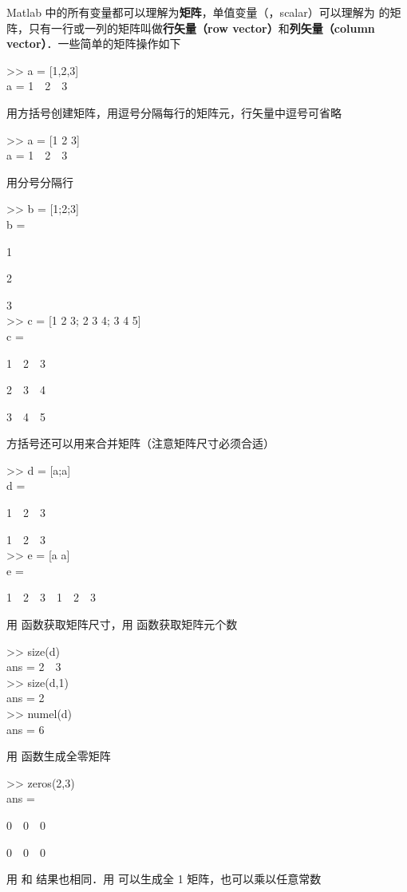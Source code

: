 Matlab 中的所有变量都可以理解为\textbf{矩阵}，单值变量（，scalar）可以理解为  的矩阵，只有一行或一列的矩阵叫做\textbf{行矢量（row vector）}和\textbf{列矢量（column vector）}．一些简单的矩阵操作如下
\begin{Command}
>> a = [1,2,3] \\
a = 1\ \ 2\ \ 3
\end{Command}
用方括号创建矩阵，用逗号分隔每行的矩阵元，行矢量中逗号可省略
\begin{Command}
>> a = [1 2 3] \\
a = 1\ \ 2\ \ 3
\end{Command}
用分号分隔行
\begin{Command}
>> b = [1;2;3] \\
b = \par
1 \par
2 \par
3 \\
>> c = [1 2 3; 2 3 4; 3 4 5]\\
c = \par
1\ \ 2\ \ 3 \par
2\ \ 3\ \ 4 \par
3\ \ 4\ \ 5
\end{Command}
方括号还可以用来合并矩阵（注意矩阵尺寸必须合适）
\begin{Command}
>> d = [a;a] \\
d = \par
1\ \ 2\ \ 3 \par
1\ \ 2\ \ 3 \\
>> e = [a a] \\
e = \par
1\ \ 2\ \ 3\ \ 1\ \ 2\ \ 3
\end{Command}
用  函数获取矩阵尺寸，用  函数获取矩阵元个数
\begin{Command}
>> size(d) \\
ans = 2\ \ 3 \\
>> size(d,1) \\
ans = 2 \\
>> numel(d) \\
ans = 6
\end{Command}
用  函数生成全零矩阵
\begin{Command}
>> zeros(2,3) \\
ans = \par
0\ \ 0\ \ 0 \par
0\ \ 0\ \ 0
\end{Command}
用  和  结果也相同．用  可以生成全 1 矩阵，也可以乘以任意常数
